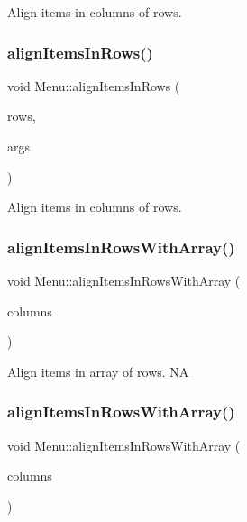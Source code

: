 Align items in columns of rows. \mbox{\label{classMenu_ac9e28ec85370f45fe4929cd393496a63}} 
\subsubsection{\texorpdfstring{align\+Items\+In\+Rows()}{alignItemsInRows()}\hspace{0.1cm}{\footnotesize\ttfamily [4/4]}}
{\footnotesize\ttfamily void Menu\+::align\+Items\+In\+Rows (\begin{DoxyParamCaption}\item[{int}]{rows,  }\item[{va\+\_\+list}]{args }\end{DoxyParamCaption})}

Align items in columns of rows. \mbox{\label{classMenu_a858eac611f439f9f9432e6ebb1ec8cc0}} 
\subsubsection{\texorpdfstring{align\+Items\+In\+Rows\+With\+Array()}{alignItemsInRowsWithArray()}\hspace{0.1cm}{\footnotesize\ttfamily [1/2]}}
{\footnotesize\ttfamily void Menu\+::align\+Items\+In\+Rows\+With\+Array (\begin{DoxyParamCaption}\item[{const Value\+Vector \&}]{columns }\end{DoxyParamCaption})}

Align items in array of rows.  NA \mbox{\label{classMenu_a858eac611f439f9f9432e6ebb1ec8cc0}} 
\subsubsection{\texorpdfstring{align\+Items\+In\+Rows\+With\+Array()}{alignItemsInRowsWithArray()}\hspace{0.1cm}{\footnotesize\ttfamily [2/2]}}
{\footnotesize\ttfamily void Menu\+::align\+Items\+In\+Rows\+With\+Array (\begin{DoxyParamCaption}\item[{const Value\+Vector \&}]{columns }\end{DoxyParamCaption})}

